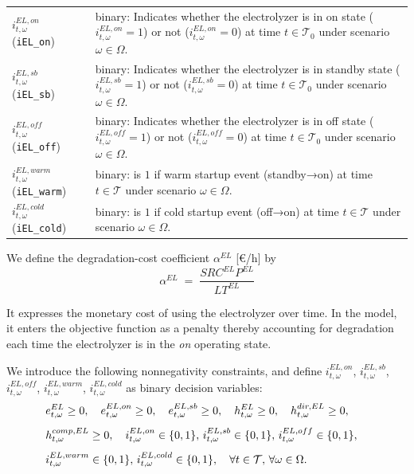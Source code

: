 \documentclass{article}
\begin{document}
\noindent
\begin{tabularx}{\textwidth}{@{}l X@{}}
    $i^{EL,on}_{t,\omega}$ \hspace{8mm} (\verb|iEL_on|)
      & binary: Indicates whether the electrolyzer is in on state
        ($i^{EL,on}_{t,\omega} = 1$) or not ($i^{EL,on}_{t,\omega} = 0$)
        at time $t \in \mathcal{T}_0$ under scenario $\omega \in \Omega$. \\
    $i^{EL,sb}_{t,\omega}$ (\verb|iEL_sb|)
      & binary: Indicates whether the electrolyzer is in standby state
        ($i^{EL,sb}_{t,\omega} = 1$) or not ($i^{EL,sb}_{t,\omega} = 0$)
        at time $t \in \mathcal{T}_0$ under scenario $\omega \in \Omega$. \\
    $i^{EL,off}_{t,\omega}$ (\verb|iEL_off|)
      & binary: Indicates whether the electrolyzer is in off state
        ($i^{EL,off}_{t,\omega} = 1$) or not ($i^{EL,off}_{t,\omega} = 0$)
        at time $t \in \mathcal{T}_0$ under scenario $\omega \in \Omega$. \\
    $i^{EL,warm}_{t,\omega}$ (\verb|iEL_warm|)
      & binary: is $1$ if warm startup event (standby→on)
        at time $t \in \mathcal{T}$ under scenario $\omega \in \Omega$. \\
    $i^{EL,cold}_{t,\omega}$ (\verb|iEL_cold|)
      & binary: is $1$ if cold startup event (off→on)
        at time $t \in \mathcal{T}$ under scenario $\omega \in \Omega$. \\
\end{tabularx}

\medskip

We define the degradation-cost coefficient $\alpha^{EL}$ [\euro{}/h] by 
        \[
          \alpha^{EL} \;=\;
          \frac{SRC^{EL}  P^{EL}}
               {LT^{EL}}
        \]

It expresses the monetary cost of using the electrolyzer over time. In the model, it enters the objective function as a penalty thereby accounting for degradation each time the electrolyzer is in the \emph{on} operating state.

\medskip


We introduce the following nonnegativity constraints, and define $i^{EL,on}_{t, \omega}$, $i^{EL,sb}_{t, \omega}$, $i^{EL,off}_{t, \omega}$, $i^{EL,warm}_{t, \omega}$, $i^{EL,cold}_{t, \omega}$ as binary decision variables:
\begin{align}
    & e^{EL}_{t,\omega} \ge 0,\quad
      e^{EL,on}_{t,\omega} \ge 0,\quad
      e^{EL,sb}_{t,\omega} \ge 0,\quad
      h^{EL}_{t,\omega} \ge 0,\quad
      h^{dir,EL}_{t,\omega} \ge 0,\quad \notag \\[1ex]
    & h^{comp,EL}_{t,\omega} \ge 0,\quad
      i^{EL,on}_{t,\omega}\in\{0,1\},\,
      i^{EL,sb}_{t,\omega}\in\{0,1\},\,
      i^{EL,off}_{t,\omega}\in\{0,1\},\quad \notag \\[1ex]
    & i^{EL,warm}_{t,\omega}\in\{0,1\},\,
      i^{EL,cold}_{t,\omega}\in\{0,1\},\quad
      \forall t\in\mathcal{T},\,\forall\omega\in\Omega.
    \label{EQ:EL_nonnegativity}
\end{align}
\end{document}
